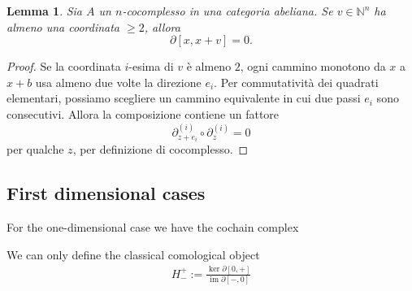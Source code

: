 \documentclass[a4paper]{article}
\DeclareMathOperator{\im}{im}
\newtheorem{lemma}[theorem]{Lemma}
\begin{document}
\begin{lemma}\label{lem:repeated-direction}
    Sia \(A\) un \(n\)-cocomplesso in una categoria abeliana.
    Se \(v \in \mathbb N^n\) ha almeno una coordinata \(\geq 2\), allora
    \[
        \partial[x,x+v] = 0.
    \]
\end{lemma}

\begin{proof}
    Se la coordinata \(i\)-esima di \(v\) è almeno \(2\), ogni cammino monotono da \(x\) a
    \(x + b\) usa almeno due volte la direzione \(e_i\). Per commutatività dei quadrati elementari, possiamo scegliere
    un cammino equivalente in cui due passi \(e_i\) sono consecutivi. Allora la composizione contiene un fattore
    \[
        \partial_{z + e_i}^{(i)} \circ \partial_z^{(i)} = 0
    \]
    per qualche \(z\), per definizione di cocomplesso.
\end{proof}

\subsection{First dimensional cases}

For the one-dimensional case we have the cochain complex
\begin{center}
\end{center}

We can only define the classical comological object
\begin{align*}
    H_{-}^+ := \frac{
        \ker \partial[0,+]
    }{
        \im \partial[-,0]
    }
\end{align*}
\end{document}
